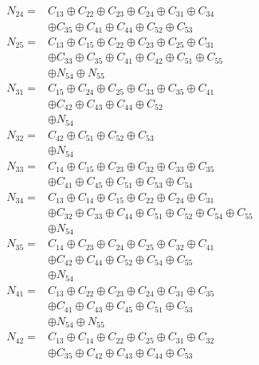 \documentclass[12pt,letterpaper]{article}
\begin{document}
\begin{align}
N_{24} = & C_{13} \oplus C_{22} \oplus C_{23} \oplus C_{24} \oplus C_{31} \oplus C_{34} \\\nonumber
& \oplus C_{35} \oplus C_{41} \oplus C_{44} \oplus C_{52} \oplus C_{53}\\
N_{25} = & C_{13} \oplus C_{15} \oplus C_{22} \oplus C_{23} \oplus C_{25} \oplus C_{31} \\\nonumber
& \oplus C_{33} \oplus C_{35} \oplus C_{41} \oplus C_{42} \oplus C_{51} \oplus C_{55} \\\nonumber
& \oplus N_{54} \oplus N_{55}\\
N_{31} = & C_{15} \oplus C_{24} \oplus C_{25} \oplus C_{33} \oplus C_{35} \oplus C_{41} \\\nonumber
& \oplus C_{42} \oplus C_{43} \oplus C_{44} \oplus C_{52} \\\nonumber
& \oplus N_{54}\\
N_{32} = & C_{42} \oplus C_{51} \oplus C_{52} \oplus C_{53} \\\nonumber
& \oplus N_{54}\\
N_{33} = & C_{14} \oplus C_{15} \oplus C_{23} \oplus C_{32} \oplus C_{33} \oplus C_{35} \\\nonumber
& \oplus C_{41} \oplus C_{45} \oplus C_{51} \oplus C_{53} \oplus C_{54}\\
N_{34} = & C_{13} \oplus C_{14} \oplus C_{15} \oplus C_{22} \oplus C_{24} \oplus C_{31} \\\nonumber
& \oplus C_{32} \oplus C_{33} \oplus C_{44} \oplus C_{51} \oplus C_{52} \oplus C_{54} \oplus C_{55} \\\nonumber
& \oplus N_{54}\\
N_{35} = & C_{14} \oplus C_{23} \oplus C_{24} \oplus C_{25} \oplus C_{32} \oplus C_{41} \\\nonumber
& \oplus C_{42} \oplus C_{44} \oplus C_{52} \oplus C_{54} \oplus C_{55} \\\nonumber
& \oplus N_{54}\\
N_{41} = & C_{13} \oplus C_{22} \oplus C_{23} \oplus C_{24} \oplus C_{31} \oplus C_{35} \\\nonumber
& \oplus C_{41} \oplus C_{43} \oplus C_{45} \oplus C_{51} \oplus C_{53} \\\nonumber
& \oplus N_{54} \oplus N_{55}\\
N_{42} = & C_{13} \oplus C_{14} \oplus C_{22} \oplus C_{25} \oplus C_{31} \oplus C_{32} \\\nonumber
& \oplus C_{35} \oplus C_{42} \oplus C_{43} \oplus C_{44} \oplus C_{53}\\

\end{align}
\end{document}
